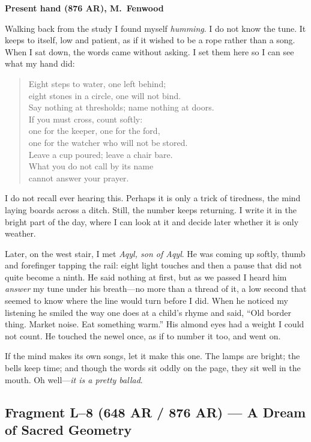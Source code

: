 \documentclass[11pt]{article}
\numberwithin{equation}{section} %
\theoremstyle{plain} %
\theoremstyle{definition} %
\theoremstyle{remark} %
\begin{document}
\medskip
\noindent\textbf{Present hand (876 AR), M.\ Fenwood}

Walking back from the study I found myself \emph{humming}. I do not know the tune. It keeps to itself, low and patient, as if it wished to be a rope rather than a song. When I sat down, the words came without asking. I set them here so I can see what my hand did:

\begin{verse}
Eight steps to water, one left behind;\\
eight stones in a circle, one will not bind.\\
Say nothing at thresholds; name nothing at doors.\\
If you must cross, count softly:\\
one for the keeper, one for the ford,\\
one for the watcher who will not be stored.\\
Leave a cup poured; leave a chair bare.\\
What you do not call by its name\\
cannot answer your prayer.
\end{verse}

I do not recall ever hearing this. Perhaps it is only a trick of tiredness, the mind laying boards across a ditch. Still, the number keeps returning. I write it in the bright part of the day, where I can look at it and decide later whether it is only weather.

Later, on the west stair, I met \textit{Aqyl, son of Aqyl}. He was coming up softly, thumb and forefinger tapping the rail: eight light touches and then a pause that did not quite become a ninth. He said nothing at first, but as we passed I heard him \emph{answer} my tune under his breath---no more than a thread of it, a low second that seemed to know where the line would turn before I did. When he noticed my listening he smiled the way one does at a child's rhyme and said, ``Old border thing. Market noise. Eat something warm.'' His almond eyes had a weight I could not count. He touched the newel once, as if to number it too, and went on.

If the mind makes its own songs, let it make this one. The lamps are bright; the bells keep time; and though the words sit oddly on the page, they sit well in the mouth. Oh well---\emph{it is a pretty ballad}.

\subsection{Fragment L--8 (648 AR / 876 AR) --- A Dream of Sacred Geometry}
\label{frag:l8}
\end{document}
